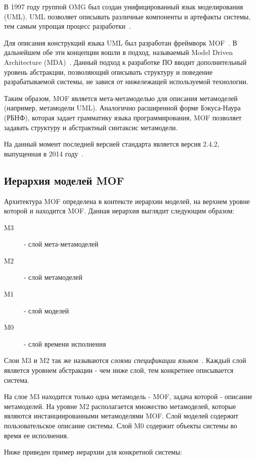 В 1997 году группой OMG был создан унифицированный язык моделирования (UML).
UML позволяет описывать различные компоненты и артефакты системы, тем
самым упрощая процесс разработки~\cite{Fowler03}.

Для описания конструкций языка UML был разработан фреймворк MOF~\cite{mof}. В
дальнейшем обе эти концепции вошли в подход, называемый Model Driven
Architecture (MDA)~\cite{miller2003}. Данный подход к разработке ПО вводит
дополнительный уровень абстракции, позволяющий описывать структуру и поведение
разрабатываемой системы, не завися от нижележащей используемой технологии.

Таким образом, MOF является мета-метамоделью для описания метамоделей (например,
метамодели UML). Аналогично расширенной форме Бэкуса-Наура (РБНФ), которая
задает грамматику языка программирования, MOF позволяет задавать структуру и
абстрактный синтаксис метамодели.

На данный момент последней версией стандарта является версия 2.4.2, выпущенная в
2014 году~\cite{mof}.

\subsection{Иерархия моделей MOF}

Архитектура MOF определена в контексте иерархии моделей, на верхнем уровне
которой и находится MOF. Данная иерархия выглядит следующим образом:

\begin{description}
    \item[M3] - слой мета-метамоделей
    \item[M2] - слой метамоделей
    \item[M1] - слой моделей
    \item[M0] - слой времени исполнения
\end{description}

Слои M3 и M2 так же называются \emph{слоями спецификации
языков}~\cite{essay57286}. Каждый слой является уровнем абстракции - чем ниже
слой, тем конкретнее описывается система.

На слое M3 находится только одна метамодель - MOF,
задача которой - описание метамоделей. На уровне M2 располагается множество
метамоделей, которые являются инстанциированными метамоделями MOF. Слой моделей
содержит пользовательское описание системы. Слой M0 содержит объекты системы во
время ее исполнения.

Ниже приведен пример иерархии для конкретной системы:


